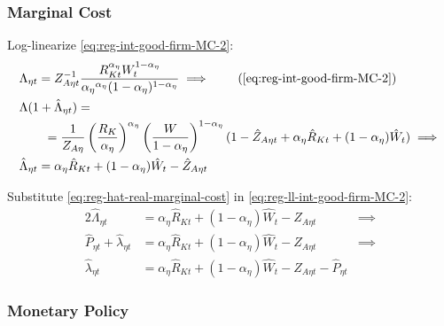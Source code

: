 \documentclass[../thesis.tex]{subfiles}
\begin{document}

\subsubsection*{Marginal Cost}

Log-linearize \ref{eq:reg-int-good-firm-MC-2}:
\begin{alignat}{2}
	& \Lambda_{\eta t} = Z_{A\eta t}^{-1} \frac{R_{Kt}^{{\alpha_{\eta}}} W_t^{1-{\alpha_{\eta}}}}{{\alpha_{\eta}}^{{\alpha_{\eta}}} (1-{\alpha_{\eta}})^{1-{\alpha_{\eta}}}} \implies \tag{\ref{eq:reg-int-good-firm-MC-2}} \\
	& \Lambda (1+ \hat{\Lambda}_{\eta t}) = \nonumber \\ & \qquad = \frac{1}{Z_{A\eta}} \left( \frac{R_{K}}{{\alpha_{\eta}}} \right)^{{\alpha_{\eta}}} \left( \frac{W}{1-{\alpha_{\eta}}} \right)^{1-{\alpha_{\eta}}} (1- \hat{Z}_{A\eta t} + {\alpha_{\eta}} \hat{R}_{Kt} + (1- {\alpha_{\eta}}) \hat{W}_{t} ) \implies \nonumber \\
	& \hat{\Lambda}_{\eta t} = {\alpha_{\eta}} \hat{R}_{Kt} + (1- {\alpha_{\eta}}) \hat{W}_{t} - \hat{Z}_{A\eta t} \label{eq:reg-ll-int-good-firm-MC-2}
\end{alignat}

Substitute \ref{eq:reg-hat-real-marginal-cost} in \ref{eq:reg-ll-int-good-firm-MC-2}:
\begin{alignat}{2}
	\hat{\Lambda}_{\eta t} &= {\alpha_{\eta}} \hat{R}_{Kt} + (1- {\alpha_{\eta}}) \hat{W}_{t} - \hat{Z}_{A\eta t} &\implies \nonumber \\
	\hat{P}_{\eta t} + \hat{\lambda}_{\eta t} &= {\alpha_{\eta}} \hat{R}_{Kt} + (1- {\alpha_{\eta}}) \hat{W}_{t} - \hat{Z}_{A\eta t} &\implies \nonumber \\
	\hat{\lambda}_{\eta t} &= {\alpha_{\eta}} \hat{R}_{Kt} + (1- {\alpha_{\eta}}) \hat{W}_{t} - \hat{Z}_{A\eta t} - \hat{P}_{\eta t} \label{eq:reg-ll-int-good-firm-MC-3}
\end{alignat}


\subsubsection*{Monetary Policy}
\end{document}
